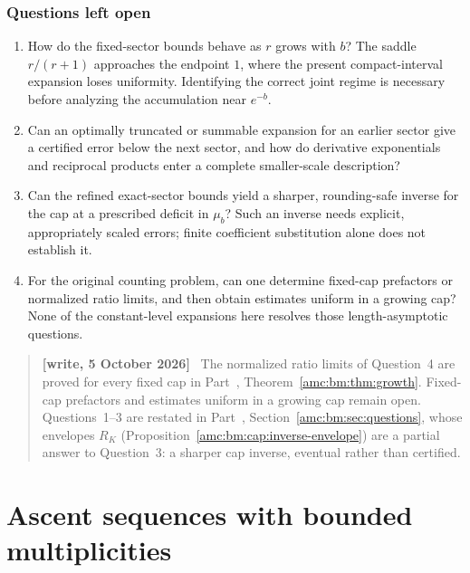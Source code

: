 \documentclass[11pt,letterpaper]{article}
\theoremstyle{remark}\newtheorem{remark}[theorem]{Remark}
\newenvironment{writenotedated}[1]{\par\smallskip\begin{quote}\small\textbf{[write, #1]}\ }{\end{quote}\smallskip}
\begin{document}
\section{Questions left open}\label{amc:sec:sec:questions}
\begin{enumerate}
\item How do the fixed-sector bounds behave as $r$ grows with $b$? The saddle $r/(r+1)$ approaches the endpoint $1$, where the present compact-interval expansion loses uniformity. Identifying the correct joint regime is necessary before analyzing the accumulation near $e^{-b}$.
\item Can an optimally truncated or summable expansion for an earlier sector give a certified error below the next sector, and how do derivative exponentials and reciprocal products enter a complete smaller-scale description?
\item Can the refined exact-sector bounds yield a sharper, rounding-safe inverse for the cap at a prescribed deficit in $\mu_b$? Such an inverse needs explicit, appropriately scaled errors; finite coefficient substitution alone does not establish it.
\item For the original counting problem, can one determine fixed-cap prefactors or normalized ratio limits, and then obtain estimates uniform in a growing cap? None of the constant-level expansions here resolves those length-asymptotic questions.
\end{enumerate}
\begin{writenotedated}{5 October 2026}
The normalized ratio limits of Question~4 are proved for every fixed cap in Part~\ref{amc:part:bm}, Theorem~\ref{amc:bm:thm:growth}. Fixed-cap prefactors and estimates uniform in a growing cap remain open. Questions~1--3 are restated in Part~\ref{amc:part:bm}, Section~\ref{amc:bm:sec:questions}, whose envelopes $R_K$ (Proposition~\ref{amc:bm:cap:inverse-envelope}) are a partial answer to Question~3: a sharper cap inverse, eventual rather than certified.
\end{writenotedated}


\part{Ascent sequences with bounded multiplicities}\label{amc:part:bm}
\end{document}
